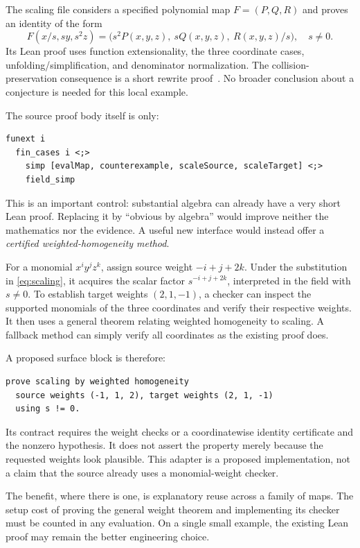 \documentclass[11pt,a4paper]{article}
\theoremstyle{remark}
\begin{document}
The scaling file considers a specified polynomial map $F=(P,Q,R)$ and proves an identity of the form
\begin{equation}
F(x/s,sy,s^2z)=\bigl(s^2P(x,y,z),\ sQ(x,y,z),\ R(x,y,z)/s\bigr),
\quad s\ne0.
\label{eq:scaling}
\end{equation}
Its Lean proof uses function extensionality, the three coordinate cases, unfolding/simplification, and denominator normalization. The collision-preservation consequence is a short rewrite proof~\cite{proveit-scaling}. No broader conclusion about a conjecture is needed for this local example.

The source proof body itself is only:
\begin{lstlisting}[caption={The existing scaling proof is already concise~\cite{proveit-scaling}.}]
  funext i
  fin_cases i <;>
    simp [evalMap, counterexample, scaleSource, scaleTarget] <;>
    field_simp
\end{lstlisting}
This is an important control: substantial algebra can already have a very short Lean proof. Replacing it by ``obvious by algebra'' would improve neither the mathematics nor the evidence. A useful new interface would instead offer a \emph{certified weighted-homogeneity method}.

For a monomial $x^iy^jz^k$, assign source weight $-i+j+2k$. Under the substitution in \eqref{eq:scaling}, it acquires the scalar factor $s^{-i+j+2k}$, interpreted in the field with $s\ne0$. To establish target weights $(2,1,-1)$, a checker can inspect the supported monomials of the three coordinates and verify their respective weights. It then uses a general theorem relating weighted homogeneity to scaling. A fallback method can simply verify all coordinates as the existing proof does.

A proposed surface block is therefore:
\begin{lstlisting}
prove scaling by weighted homogeneity
  source weights (-1, 1, 2), target weights (2, 1, -1)
  using s != 0.
\end{lstlisting}
Its contract requires the weight checks or a coordinatewise identity certificate and the nonzero hypothesis. It does not assert the property merely because the requested weights look plausible. This adapter is a proposed implementation, not a claim that the source already uses a monomial-weight checker.

The benefit, where there is one, is explanatory reuse across a family of maps. The setup cost of proving the general weight theorem and implementing its checker must be counted in any evaluation. On a single small example, the existing Lean proof may remain the better engineering choice.
\end{document}
